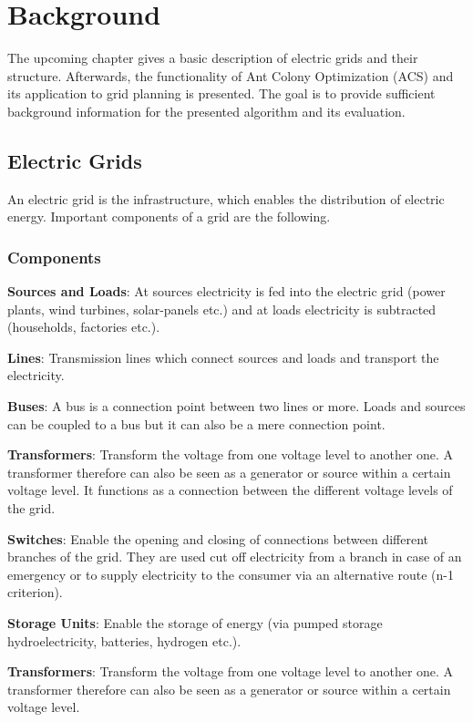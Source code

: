 \chapter{Background}\label{chap:background}
The upcoming chapter gives a basic description of electric grids and their structure. Afterwards, the functionality of Ant Colony Optimization (ACS) and its application to grid planning is presented. The goal is to provide sufficient background information for the presented algorithm and its evaluation.

\section{Electric Grids}
An electric grid is the infrastructure, which enables the distribution of electric energy. Important components of a grid are the following.

\subsection{Components}\label{sec:components}

\textbf{Sources and Loads}: At sources electricity is fed into the electric grid (power plants, wind turbines, solar-panels etc.) and at loads electricity is subtracted (households, factories etc.).

\textbf{Lines}: Transmission lines which connect sources and loads and transport the electricity.

\textbf{Buses}: A bus is a connection point between two lines or more. Loads and sources can be coupled to a bus but it can also be a mere connection point.

\textbf{Transformers}: Transform the voltage from one voltage level to another one. A transformer therefore can also be seen as a generator or source within a certain voltage level. It functions as a connection between the different voltage levels of the grid.

\textbf{Switches}: Enable the opening and closing of connections between different branches of the grid. They are used cut off electricity from a branch in case of an emergency or to supply electricity to the consumer via an alternative route (n-1 criterion).

\textbf{Storage Units}: Enable the storage of energy (via pumped storage hydroelectricity, batteries, hydrogen etc.). 


\textbf{Transformers}: Transform the voltage from one voltage level to another one. A transformer therefore can also be seen as a generator or source within a certain voltage level.

